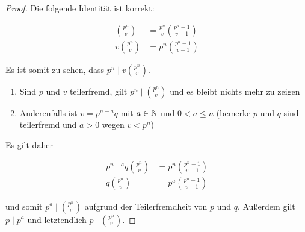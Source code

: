 \begin{proof}
  Die folgende Identität ist korrekt:
  \begin{widemath}
    \begin{equation*}
      \begin{aligned}
        \binom{p^n}{v}  & = \frac{p^n}{v}\binom{p^n - 1}{v - 1} \\
        v\binom{p^n}{v} & = p^n\binom{p^n - 1}{v - 1}
      \end{aligned}
    \end{equation*}
  \end{widemath}
  Es ist somit zu sehen, dass $p^n \mid v\binom{p^n}{v}$.
  \begin{enumerate}
    \item Sind $p$ und $v$ teilerfremd, gilt $p^n \mid \binom{p^n}{v}$ und es
          bleibt nichts mehr zu zeigen \parencite[64]{book:zahlentheorie}
    \item Anderenfalls ist $v = p^{n-a}q$ mit $a \in \mathbb{N}$ und $0 < a \leq n$
          (bemerke $p$ und $q$ sind teilerfremd und $a > 0$ wegen $v < p^n$)
  \end{enumerate}
  \noindent
  Es gilt daher
  \begin{widemath}
    \begin{align*}
      p^{n-a}q\binom{p^n}{v} & = p^n\binom{p^n - 1}{v - 1} \\
      q\binom{p^n}{v}        & = p^a\binom{p^n - 1}{v - 1}
    \end{align*}
  \end{widemath}
  \noindent
  und somit $p^a \mid \binom{p^n}{v}$ aufgrund der
  Teilerfremdheit von $p$ und $q$.
  Außerdem gilt $p \mid p^a$ und letztendlich $p \mid \binom{p^n}{v}$.
\end{proof}

